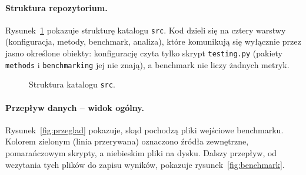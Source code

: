\documentclass{article}
\newcommand{\code}[1]{\texttt{#1}}
\begin{document}
\paragraph{Struktura repozytorium.}
Rysunek~\ref{fig:struktura} pokazuje strukturę katalogu \code{src}. Kod dzieli się na
cztery warstwy (konfiguracja, metody, benchmark, analiza), które komunikują się wyłącznie
przez jasno określone obiekty: konfigurację czyta tylko skrypt \code{testing.py} (pakiety
\code{methods} i \code{benchmarking} jej nie znają), a benchmark nie liczy żadnych metryk.

\begin{figure}[H]
\centering
{}
\caption{Struktura katalogu \code{src}.}
\label{fig:struktura}
\end{figure}

\paragraph{Przepływ danych -- widok ogólny.}
Rysunek~\ref{fig:przeglad} pokazuje, skąd pochodzą pliki wejściowe benchmarku. Kolorem
zielonym (linia przerywana) oznaczono źródła zewnętrzne, pomarańczowym skrypty, a
niebieskim pliki na dysku. Dalszy przepływ, od wczytania tych plików do zapisu wyników,
pokazuje rysunek~\ref{fig:benchmark}.
\end{document}
